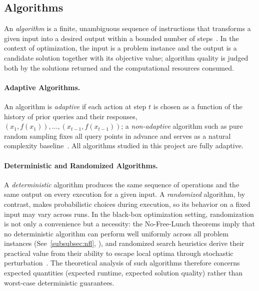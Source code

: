 \subsection{Algorithms}
\label{subsec:algorithms}

An \textit{algorithm} is a finite, unambiguous sequence of instructions
that transforms a given input into a desired output within a bounded
number of steps~\cite{hoos2005intro}. In the context of optimization,
the input is a problem instance and the output is a candidate solution
together with its objective value; algorithm quality is judged both by
the solutions returned and the computational resources consumed.

\paragraph{Adaptive Algorithms.}

An algorithm is \textit{adaptive} if each action at step $t$ is chosen
as a function of the history of prior queries and their responses,
$(x_1,f(x_1)),\ldots,(x_{t-1},f(x_{t-1}))$; a \textit{non-adaptive}
algorithm such as pure random sampling fixes all query points in
advance and serves as a natural complexity
baseline~\cite{droste2006blackbox}. All algorithms studied in this
project are fully adaptive.

\paragraph{Deterministic and Randomized Algorithms.}
A \textit{deterministic} algorithm produces the same sequence of
operations and the same output on every execution for a given input.
A \textit{randomized} algorithm, by contrast, makes probabilistic
choices during execution, so its behavior on a fixed input may vary
across runs. In the black-box optimization setting, randomization is
not only a convenience but a necessity: the No-Free-Lunch theorems
imply that no deterministic algorithm can perform well uniformly
across all problem instances (See~\ref{subsubsec:nfl},
\citet{wolpert2002no}), and randomized search heuristics derive
their practical value from their ability to escape local optima
through stochastic perturbation~\cite{doerr2020theory,hoos2005intro}.
The theoretical analysis of such algorithms therefore concerns
expected quantities (expected runtime, expected solution quality)
rather than worst-case deterministic guarantees.


